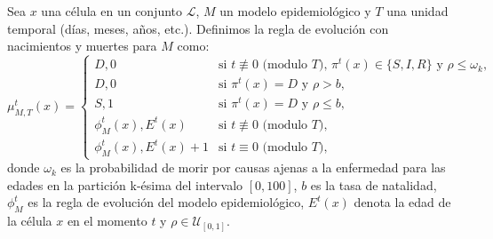 \begin{definition}\label{def:reglaNatalidadyMortalidad}
Sea $x$ una célula en un conjunto $\mathcal{L}$, $M$ un modelo epidemiológico y $T$ una unidad temporal (días, meses, años, etc.). Definimos la regla de evolución con nacimientos y muertes para $M$ como:
\begin{equation}
    \mu_{M,T}^t(x)=\left\{\begin{array}{ll}
        D,0 & \text{si }t\not\equiv 0 \text{ (modulo }T\text{), }\pi^t(x)\in\{S,I,R\}\text{ y }\rho\leq\omega_k, \\
        D,0 & \text{si }\pi^t(x)=D\text{ y }\rho>b,\\
        S,1 & \text{si }\pi^t(x)=D\text{ y }\rho\leq b,\\
        \phi_M^t(x),E^t(x) & \text{si }t\not\equiv 0 \text{ (modulo }T),\\
        \phi_M^t(x),E^t(x)+1 & \text{si }t\equiv 0 \text{ (modulo }T),
    \end{array}\right.
\end{equation}
donde $\omega_k$ es la probabilidad de morir por causas ajenas a la enfermedad para las edades en la partición k-ésima del intervalo $[0,100]$, $b$ es la tasa de natalidad, $\phi_M^t$ es la regla de evolución del modelo epidemiológico, $E^t(x)$ denota la edad de la célula $x$ en el momento $t$ y $\rho\in\mathcal{U}_{[0,1]}$.
\end{definition}

